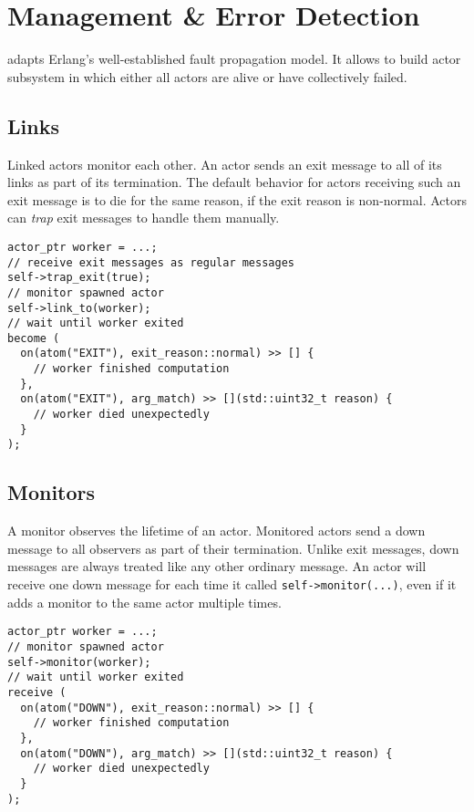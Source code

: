 \section{Management \& Error Detection}

\libcppa adapts Erlang's well-established fault propagation model.
It allows to build actor subsystem in which either all actors are alive or have collectively failed.

\subsection{Links}

Linked actors monitor each other.
An actor sends an exit message to all of its links as part of its termination.
The default behavior for actors receiving such an exit message is to die for the same reason, if the exit reason is non-normal.
Actors can \textit{trap} exit messages to handle them manually.

\begin{lstlisting}
actor_ptr worker = ...;
// receive exit messages as regular messages
self->trap_exit(true);
// monitor spawned actor
self->link_to(worker);
// wait until worker exited
become (
  on(atom("EXIT"), exit_reason::normal) >> [] {
    // worker finished computation
  },
  on(atom("EXIT"), arg_match) >> [](std::uint32_t reason) {
    // worker died unexpectedly
  }
);
\end{lstlisting}

\subsection{Monitors}
\label{Sec::Management::Monitors}

A monitor observes the lifetime of an actor.
Monitored actors send a down message to all observers as part of their termination.
Unlike exit messages, down messages are always treated like any other ordinary message.
An actor will receive one down message for each time it called \lstinline^self->monitor(...)^, even if it adds a monitor to the same actor multiple times.

\begin{lstlisting}
actor_ptr worker = ...;
// monitor spawned actor
self->monitor(worker);
// wait until worker exited
receive (
  on(atom("DOWN"), exit_reason::normal) >> [] {
    // worker finished computation
  },
  on(atom("DOWN"), arg_match) >> [](std::uint32_t reason) {
    // worker died unexpectedly
  }
);
\end{lstlisting}

